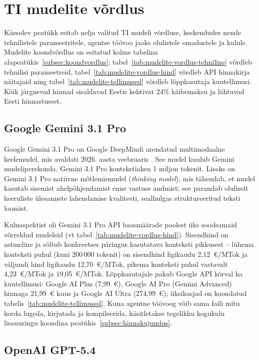 \section{TI mudelite võrdlus} \label{mudelid}

Käesolev peatükk esitab nelja valitud TI mudeli võrdluse, keskendudes nende tehnilistele parameetritele, agentse töövoo jaoks olulistele omadustele ja kulule. Mudelite koondvõrdlus on esitatud kolme tabelina alapeatükis~\ref{subsec:koondvordlus}: tabel~\ref{tab:mudelite-vordlus-tehniline} võrdleb tehnilisi parameetreid, tabel~\ref{tab:mudelite-vordlus-hind} võrdleb API hinnakirja näitajaid ning tabel~\ref{tab:mudelite-tellimused} võrdleb lõppkasutaja kuutellimusi. Kõik järgnevad hinnad sisaldavad Eestis kehtivat 24\% käibemaksu ja lähtuvad Eesti hinnastusest.

\subsection{Google Gemini 3.1 Pro} \label{subsec:gemini}

Google Gemini 3.1 Pro on Google DeepMindi arendatud multimodaalne keelemudel, mis avaldati 2026. aasta veebruaris \cite{google2026gemini}. See mudel kuulub Gemini mudeliperekonda. Gemini 3.1 Pro kontekstiaken 1 miljon tokenit. Lisaks on Gemini 3.1 Pro natiivne mõtlemismudel (\textit{thinking model}), mis tähendab, et mudel kasutab sisemist ahelpõhjendamist enne vastuse andmist; see parandab oluliselt keeruliste ülesannete lahendamise kvaliteeti, sealhulgas struktureeritud teksti loomist.

Kuluaspektist oli Gemini 3.1 Pro API baasmäärade poolest üks soodsamaid võrreldud mudeleid (vt tabel~\ref{tab:mudelite-vordlus-hind}). Sisendhind on astmeline ja sõltub konkreetses päringus kasutatava konteksti pikkusest -- lühema konteksti puhul (kuni 200\,000 tokenit) on sisendhind ligikaudu 2,12~€/MTok ja väljundi hind ligikaudu 12,70~€/MTok, pikema konteksti puhul vastavalt 4,23~€/MTok ja 19,05~€/MTok. Lõppkasutajale pakub Google API kõrval ka kuutellimusi: Google AI Plus (7,99~€), Google AI Pro (Gemini Advanced) hinnaga 21,99~€ kuus ja Google AI Ultra (274,99~€); üksikasjad on koondatud tabelis~\ref{tab:mudelite-tellimused}. Kuna agentne töövoog võib sama faili mitu korda lugeda, kirjutada ja kompileerida, käsitletakse tegelikku kogukulu lisauuringu koondina peatükis~\ref{subsec:hinnakujundus}.

\subsection{OpenAI GPT-5.4} \label{subsec:chatgpt}

